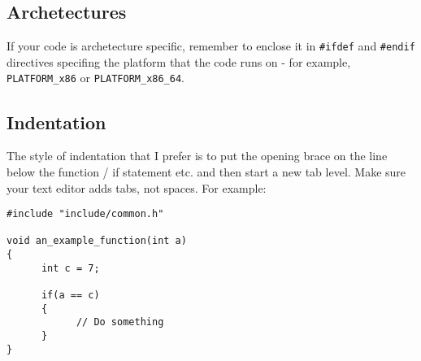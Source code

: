 \subsection{Archetectures}
If your code is archetecture specific, remember to enclose it in \texttt{\#ifdef} and \texttt{\#endif} directives
specifing the platform that the code runs on - for example, \texttt{PLATFORM\_x86} or \texttt{PLATFORM\_x86\_64}.

\subsection{Indentation}
The style of indentation that I prefer is to put the opening brace on the line below the function / if statement etc.
and then start a new tab level. Make sure your text editor adds tabs, not spaces. For example:

\begin{verbatim}
#include "include/common.h"

void an_example_function(int a)
{
      int c = 7;
	
      if(a == c)
      {
            // Do something
      }
}
\end{verbatim}

